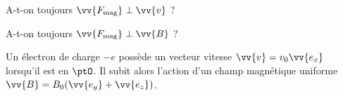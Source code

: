 \debutEntrainement


\begin{enonce}
A-t-on toujours $\vv{F_{\text{mag}}} \perp \vv{v}$ ?
\end{enonce}




\begin{enonce}
A-t-on toujours $\vv{F_{\text{mag}}} \perp \vv{B}$ ?
\end{enonce}



\finEntrainement





\hauteurLargeurCadreReponse		{8mm}{2cm}
\initialisationEntrainement

                                \initialisationPartieGauche %
Un électron de charge $-e$ possède un vecteur vitesse $\vv{v}=v_0 \vv{e_x}$ lorsqu'il est en $\ptO$. Il subit alors l'action d'un champ magnétique uniforme $\vv{B}=B_0(\vv{e_y} + \vv{e_z})$.

